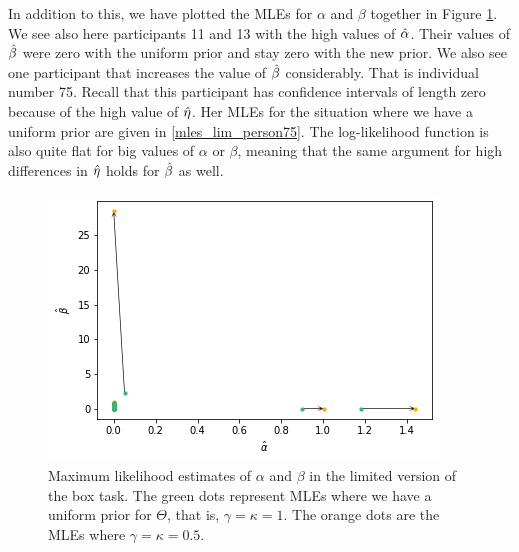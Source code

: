 In addition to this, we have plotted the MLEs for $\alpha$ and $\beta$ together in Figure \ref{fig:sensitivity_mles_lim_a_b}. We see also here participants 11 and 13 with the high values of $\hat{\alpha}$. Their values of $\hat{\beta}$ were zero with the uniform prior and stay zero with the new prior. We also see one participant that increases the value of $\hat{\beta}$ considerably. That is individual number 75. Recall that this participant has confidence intervals of length zero because of the high value of $\hat{\eta}$. Her MLEs for the situation where we have a uniform prior are given in \eqref{mles_lim_person75}. The log-likelihood function is also quite flat for big values of $\alpha$ or $\beta$, meaning that the same argument for high differences in $\hat{\eta}$ holds for $\hat{\beta}$ as well.  
\begin{figure}
    \centering
    \includegraphics[scale=0.8]{pictures/Sensitivity/mles_lim_a_b.png}
    \caption[MLEs of $\alpha$ and $\beta$ for prior with $\gamma=\kappa=1$ and $\gamma=\kappa=0.5$, limited]{
    Maximum likelihood estimates of $\alpha$ and $\beta$ in the limited version of the box task. The green dots represent MLEs where we have a uniform prior for $\Theta$, that is, $\gamma=\kappa=1$. The orange dots are the MLEs where $\gamma=\kappa=0.5$.}
    \label{fig:sensitivity_mles_lim_a_b}
\end{figure}

